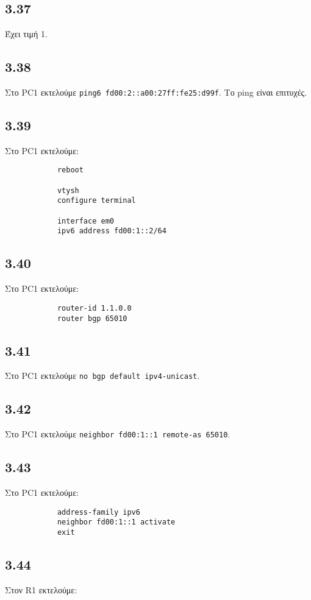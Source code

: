 \documentclass[a4paper, 12pt]{article}
\begin{document}
	\subsection*{3.37}
		Έχει τιμή 1.

	\subsection*{3.38}
		Στο PC1 εκτελούμε \verb|ping6 fd00:2::a00:27ff:fe25:d99f|. Το ping είναι επιτυχές.
		
	\subsection*{3.39}
		Στο PC1 εκτελούμε:
		
		\begin{verbatim}
			reboot
			
			vtysh
			configure terminal
			
			interface em0
			ipv6 address fd00:1::2/64
		\end{verbatim}

	\subsection*{3.40}
		Στο PC1 εκτελούμε:
		
		\begin{verbatim}
			router-id 1.1.0.0
			router bgp 65010
		\end{verbatim}

	\subsection*{3.41}
		Στο PC1 εκτελούμε \verb|no bgp default ipv4-unicast|.

	\subsection*{3.42}
		Στο PC1 εκτελούμε \verb|neighbor fd00:1::1 remote-as 65010|.

	\subsection*{3.43}
		Στο PC1 εκτελούμε:
		
		\begin{verbatim}
			address-family ipv6
			neighbor fd00:1::1 activate
			exit
		\end{verbatim}

	\subsection*{3.44}
		Στον R1 εκτελούμε:
		
\end{document}
